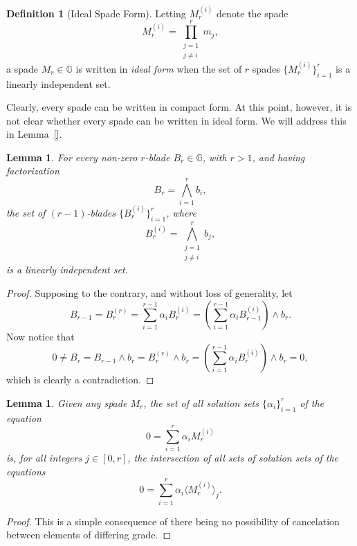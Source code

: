 \documentclass{birkjour}
\newtheorem{lem}[thm]{Lemma}
\theoremstyle{definition}
\newtheorem{defn}[thm]{Definition}
\theoremstyle{remark}
\numberwithin{equation}{section}
\newcommand{\G}{\mathbb{G}}
\begin{document}
\begin{defn}[Ideal Spade Form]
Letting $M_r^{(i)}$ denote the spade
\begin{equation*}
M_r^{(i)}=\prod_{\substack{j=1\\j\neq i}}^r m_j,
\end{equation*}
a spade $M_r\in\G$ is written in \emph{ideal form} when the set of $r$ spades $\{M_r^{(i)}\}_{i=1}^r$
is a linearly independent set.
\end{defn}

Clearly, every spade can be written in compact form.
At this point, however, it is not clear whether every spade can be written in ideal form.
We will address this in Lemma~\ref{}.

\begin{lem}\label{lem_lin_indep_blades}
For every non-zero $r$-blade $B_r\in\G$, with $r>1$, and having factorization
\begin{equation*}
B_r = \bigwedge_{i=1}^r b_i,
\end{equation*}
the set of $(r-1)$-blades $\{B_r^{(i)}\}_{i=1}^r$, where
\begin{equation*}
B_r^{(i)}=\bigwedge_{\substack{j=1\\j\neq i}}^r b_j,
\end{equation*}
is a linearly independent set.
\end{lem}
\begin{proof}
Supposing to the contrary, and without loss of generality, let
\begin{equation*}
B_{r-1} = B_r^{(r)} = \sum_{i=1}^{r-1}\alpha_i B_r^{(i)} = \left(\sum_{i=1}^{r-1}\alpha_i B_{r-1}^{(i)}\right)\wedge b_r.
\end{equation*}
Now notice that
\begin{equation*}
0\neq B_r = B_{r-1}\wedge b_r = B_r^{(r)}\wedge b_r = \left(\sum_{i=1}^{r-1}\alpha_i B_r^{(i)}\right)\wedge b_r = 0,
\end{equation*}
which is clearly a contradiction.
\end{proof}

\begin{lem}\label{lem_solution_intersection}
Given any spade $M_r$, the set of all solution sets $\{\alpha_i\}_{i=1}^r$ of the equation
\begin{equation*}
0 = \sum_{i=1}^r\alpha_i M_r^{(i)}
\end{equation*}
is, for all integers $j\in[0,r]$, the intersection of all sets of solution sets of the equations
\begin{equation*}
0 = \sum_{i=1}^r\alpha_i\langle M_r^{(i)}\rangle_j.
\end{equation*}
\end{lem}
\begin{proof}
This is a simple consequence of there being no possibility of cancelation between elements of differing grade.
\end{proof}
\end{document}
